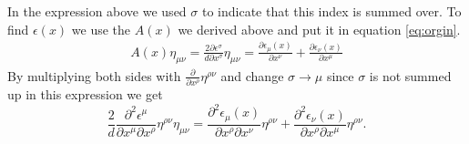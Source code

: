 In the expression above we used $\sigma$ to indicate that this index is summed over.
To find $\epsilon(x)$ we use the $A(x)$ we derived above and put it in equation \ref{eq:orgin}. 
\begin{gather}
A(x) \eta_{\mu \nu}= \frac{2 \partial \epsilon ^\sigma}{d \partial x^\sigma } \eta_{\mu \nu}=\frac{\partial \epsilon_\mu (x)}{\partial x^\nu}+\frac{\partial \epsilon_\nu (x)}{\partial x^\mu}
\label{eq:nu mu}
\end{gather}
By multiplying both sides with $\frac{\partial }{\partial x^\rho}\eta^{\rho \nu}$ and change $\sigma\rightarrow \mu$ since $\sigma$ is not summed up in this expression we get
\[
 \frac{2}{d}\frac{ \partial^2 \epsilon ^\mu}{ \partial x^\mu \partial x^\rho  } \eta^{\rho \nu} \eta_{\mu \nu}=\frac{\partial^2 \epsilon_\mu (x)}{\partial x^\rho \partial x^\nu}\eta^{\rho \nu}+\frac{\partial^2 \epsilon_\nu (x)}{\partial x^\rho \partial x^\mu}\eta^{\rho \nu}.
\]

